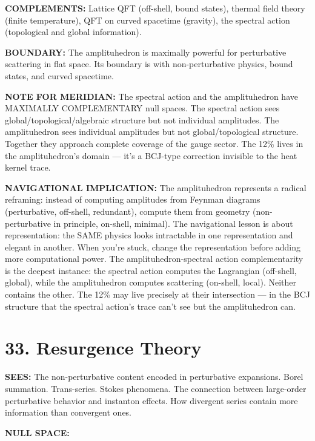 \textbf{COMPLEMENTS:} Lattice QFT (off-shell, bound states), thermal field theory (finite temperature), QFT on curved spacetime (gravity), the spectral action (topological and global information).


\textbf{BOUNDARY:} The amplituhedron is maximally powerful for perturbative scattering in flat space. Its boundary is with non-perturbative physics, bound states, and curved spacetime.


\textbf{NOTE FOR MERIDIAN:} The spectral action and the amplituhedron have MAXIMALLY COMPLEMENTARY null spaces. The spectral action sees global/topological/algebraic structure but not individual amplitudes. The amplituhedron sees individual amplitudes but not global/topological structure. Together they approach complete coverage of the gauge sector. The 12\% lives in the amplituhedron's domain — it's a BCJ-type correction invisible to the heat kernel trace.


\textbf{NAVIGATIONAL IMPLICATION:} The amplituhedron represents a radical reframing: instead of computing amplitudes from Feynman diagrams (perturbative, off-shell, redundant), compute them from geometry (non-perturbative in principle, on-shell, minimal). The navigational lesson is about representation: the SAME physics looks intractable in one representation and elegant in another. When you're stuck, change the representation before adding more computational power. The amplituhedron-spectral action complementarity is the deepest instance: the spectral action computes the Lagrangian (off-shell, global), while the amplituhedron computes scattering (on-shell, local). Neither contains the other. The 12\% may live precisely at their intersection — in the BCJ structure that the spectral action's trace can't see but the amplituhedron can.


\bigskip\noindent\makebox[\textwidth]{\color{rulegray}\rule{5cm}{0.3pt}}\bigskip


\section*{33. Resurgence Theory}


\textbf{SEES:} The non-perturbative content encoded in perturbative expansions. Borel summation. Trans-series. Stokes phenomena. The connection between large-order perturbative behavior and instanton effects. How divergent series contain more information than convergent ones.


\textbf{NULL SPACE:}

